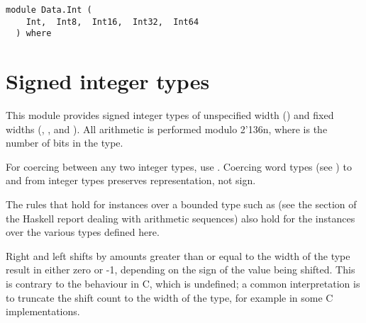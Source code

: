 \label{module:Data.Int}
\haddockbeginheader
{\haddockverb\begin{verbatim}
module Data.Int (
    Int,  Int8,  Int16,  Int32,  Int64
  ) where\end{verbatim}}
\haddockendheader

\section{Signed integer types
}
This module provides signed integer types of unspecified width ()
and fixed widths (, ,  and ).  All
arithmetic is performed modulo 2{\char '136}n, where  is the number of bits in
the type.
\par
For coercing between any two integer types, use
.  Coercing word types (see ) to and
from integer types preserves representation, not sign.
\par
The rules that hold for  instances over a bounded type
such as  (see the section of the Haskell report dealing with
arithmetic sequences) also hold for the  instances over
the various  types defined here.
\par
Right and left shifts by amounts greater than or equal to the width of
the type result in either zero or -1, depending on the sign of the
value being shifted.  This is contrary to the behaviour in C, which is
undefined; a common interpretation is to truncate the shift count to
the width of the type, for example  in some C
implementations.
\par

